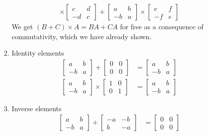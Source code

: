 \documentclass[letterpaper]{article}
\begin{document}
\begin{enumerate}
\begin{enumerate}
\begin{enumerate}
\begin{align*}
        \times\left[\begin{array}{rr}c&d\\-d&c\end{array}\right]
        +\left[\begin{array}{rr}a&b\\-b&a\end{array}\right]
        \times\left[\begin{array}{rr}e&f\\-f&e\end{array}\right]
      \end{align*}
      We get $(B+C)\times A=BA+CA$ for free as a consequence of commutativity, which we have already shown.
    \item
      Identity elements
      \begin{align*}
        \left[\begin{array}{rr}a&b\\-b&a\end{array}\right]
        +\left[\begin{array}{rr}0&0\\0&0\end{array}\right]
        &=\left[\begin{array}{rr}a&b\\-b&a\end{array}\right]\\
        \left[\begin{array}{rr}a&b\\-b&a\end{array}\right]
        \times\left[\begin{array}{rr}1&0\\0&1\end{array}\right]
        &=\left[\begin{array}{rr}a&b\\-b&a\end{array}\right]
      \end{align*}
    \item
      Inverse elements
      \begin{align*}
        \left[\begin{array}{rr}a&b\\-b&a\end{array}\right]
        +\left[\begin{array}{rr}-a&-b\\b&-a\end{array}\right]
        &=\left[\begin{array}{rr}0&0\\0&0\end{array}\right]\\

\end{align*}
\end{enumerate}
\end{enumerate}
\end{enumerate}
\end{document}
